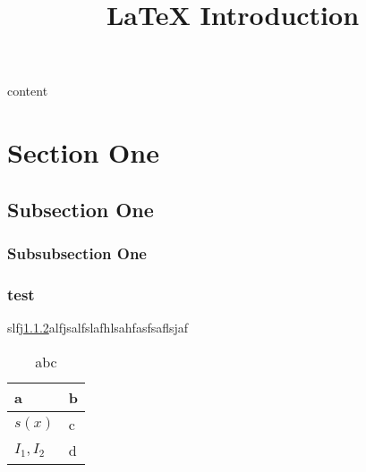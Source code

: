 \documentclass[UTF8,a4paper,12pt]{article}
\title{LaTeX Introduction}
\date{} %
\begin{document}
  \maketitle
  content

  \section{Section One}
  \subsection{Subsection One}
  \subsubsection{Subsubsection One}
  \subsubsection[abc]{test}\label{sec:system}

  slfj\ref{sec:system}alfjsalfslafhlsahfasfsaflsjaf

  \begin{table}[htp]
	\centering
	\caption{abc}
	\begin{tabular*}{\textwidth}{@{\extracolsep{\fill}}ll}%
		\toprule
		a             & b \\
		\midrule
		$s(x)$   		& c      \\
		$I_1,I_2$        & d\\
		\bottomrule
	\end{tabular*}
	\label{tab:symbol}
\end{table}
\end{document}
